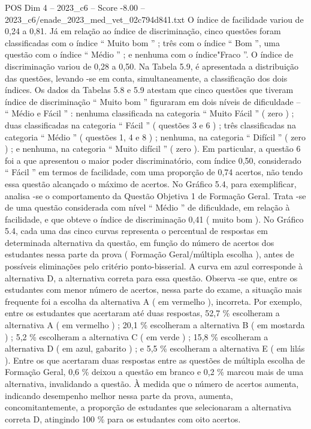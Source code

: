 \begin{textsample}{POS Dim 4 – 2023\_c6 – Score -8.00 – 2023\_c6/enade\_2023\_med\_vet\_02c794d841.txt}
O índice de facilidade variou de 0,24 a 0,81.
Já em relação ao índice de discriminação, cinco questões foram classificadas com o índice “ Muito bom ” ; três com o índice “ Bom ”, uma questão com o índice “ Médio ” ; e nenhuma com o índice"Fraco ”.
O índice de discriminação variou de 0,28 a 0,50.
Na Tabela 5.9, é apresentada a distribuição das questões, levando -se em conta, simultaneamente, a classificação dos dois índices.
Os dados da Tabelas 5.8 e 5.9 atestam que cinco questões que tiveram índice de discriminação “ Muito bom ” figuraram em dois níveis de dificuldade – “ Médio e Fácil ” : nenhuma classificada na categoria “ Muito Fácil ” ( zero ) ; duas classificadas na categoria “ Fácil ” ( questões 3 e 6 ) ; três classificadas na categoria “ Médio ” ( questões 1, 4 e 8 ) ; nenhuma, na categoria “ Difícil ” ( zero ) ; e nenhuma, na categoria “ Muito difícil ” ( zero ).
Em particular, a questão 6 foi a que apresentou o maior poder discriminatório, com índice 0,50, considerado “ Fácil ” em termos de facilidade, com uma proporção de 0,74 acertos, não tendo essa questão alcançado o máximo de acertos.
No Gráfico 5.4, para exemplificar, analisa -se o comportamento da Questão Objetiva 1 de Formação Geral.
Trata -se de uma questão considerada com nível “ Médio ” de dificuldade, em relação à facilidade, e que obteve o índice de discriminação 0,41 ( muito bom ).
No Gráfico 5.4, cada uma das cinco curvas representa o percentual de respostas em determinada alternativa da questão, em função do número de acertos dos estudantes nessa parte da prova ( Formação Geral/múltipla escolha ), antes de possíveis eliminações pelo critério ponto-bisserial.
A curva em azul corresponde à alternativa D, a alternativa correta para essa questão.
Observa -se que, entre os estudantes com menor número de acertos, nessa parte do exame, a situação mais frequente foi a escolha da alternativa A ( em vermelho ), incorreta.
Por exemplo, entre os estudantes que acertaram até duas respostas, 52,7 \% escolheram a alternativa A ( em vermelho ) ; 20,1 \% escolheram a alternativa B ( em mostarda ) ; 5,2 \% escolheram a alternativa C ( em verde ) ; 15,8 \% escolheram a alternativa D ( em azul, gabarito ) ; e 5,5 \% escolheram a alternativa E ( em lilás ).
Entre os que acertaram duas respostas entre as questões de múltipla escolha de Formação Geral, 0,6 \% deixou a questão em branco e 0,2 \% marcou mais de uma alternativa, invalidando a questão.
À medida que o número de acertos aumenta, indicando desempenho melhor nessa parte da prova, aumenta, concomitantemente, a proporção de estudantes que selecionaram a alternativa correta D, atingindo 100 \% para os estudantes com oito acertos.

\end{textsample}
